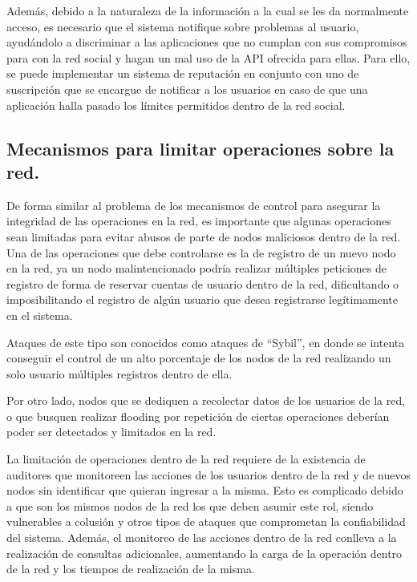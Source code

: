     Además, debido a la naturaleza de la información a la cual se les da
    normalmente acceso, es necesario que el sistema notifique sobre problemas al
    usuario, ayudándolo a discriminar a las aplicaciones que no cumplan con sus
    compromisos para con la red social y hagan un mal uso de la API ofrecida para
    ellas. Para ello, se puede implementar un
    sistema de reputación en conjunto con uno de suscripción que se encargue de
    notificar a los usuarios en caso de que una aplicación halla pasado los
    límites permitidos dentro de la red social.

  \subsection{Mecanismos para limitar operaciones sobre la red.}
      De forma similar al problema de los mecanismos de control para asegurar
      la integridad de las operaciones en la red, es importante que algunas
      operaciones sean limitadas para evitar abusos de parte de nodos maliciosos
      dentro de la red. 
      Una de las operaciones que debe controlarse es la de registro de un nuevo
      nodo en la red, ya un nodo malintencionado podría realizar múltiples
      peticiones de registro de forma de reservar cuentas de usuario dentro de la
      red, dificultando o imposibilitando el registro de algún usuario que desea
      registrarse legítimamente en el sistema.

      Ataques de este tipo son conocidos como ataques de ``Sybil'', en donde se
      intenta conseguir el control de un alto porcentaje de los nodos de la red
      realizando un solo usuario múltiples registros dentro de ella.

      Por otro lado, nodos que se dediquen a recolectar datos de los usuarios
      de la red, o que busquen realizar flooding por repetición de ciertas
      operaciones deberían poder ser detectados y limitados en la red.

      La limitación de operaciones dentro de la red requiere de la existencia
      de auditores que monitoreen las acciones de los usuarios dentro de la red y de
      nuevos nodos sin identificar que quieran ingresar a la misma. Esto es
      complicado debido a que son los mismos nodos de la red los que deben asumir
      este rol, siendo vulnerables a colusión y otros tipos de ataques que
      comprometan la confiabilidad del sistema. Además, el monitoreo de las
      acciones dentro de la red conlleva a la realización de consultas adicionales,
      aumentando la carga de la operación dentro de la red y los tiempos de
      realización de la misma.

